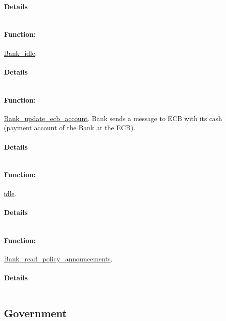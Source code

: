 \documentclass[a4paper,11pt]{article}
\begin{document}
\paragraph{Details}
\begin{verbatim}
\end{verbatim}
\paragraph{Function:}\url{Bank_idle}.

\paragraph{Details}
\begin{verbatim}
\end{verbatim}
\paragraph{Function:}\url{Bank_update_ecb_account}.
Bank sends a message to ECB with its cash (payment account of the Bank at the ECB).
\paragraph{Details}
\begin{verbatim}
\end{verbatim}
\paragraph{Function:}\url{idle}.

\paragraph{Details}
\begin{verbatim}
\end{verbatim}
\paragraph{Function:}\url{Bank_read_policy_announcements}.

\paragraph{Details}
\begin{verbatim}
\end{verbatim}
\subsection{Government}
\end{document}
